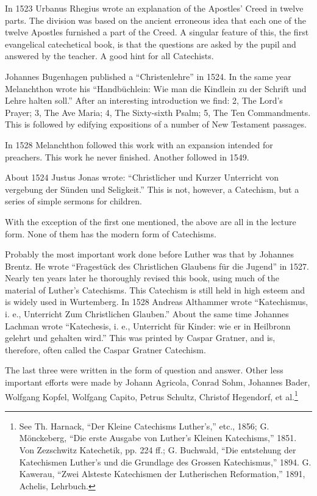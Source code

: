 In 1523 Urbanus Rhegius wrote an explanation of the Apostles’ Creed in twelve parts. The division was based on the ancient erroneous idea that each one of the twelve Apostles furnished a part of the Creed. A singular feature of this, the first evangelical
catechetical book, is that the questions are asked by the pupil and answered by the teacher. A good hint for all Catechists.

Johannes Bugenhagen published a “Christenlehre” in 1524. In the same year Melanchthon wrote his “Handbüchlein: Wie man die Kindlein zu der Schrift und Lehre halten soll.” After an interesting introduction we find: 2, The Lord’s Prayer; 3, The Ave Maria; 4, The Sixty-sixth Psalm; 5, The Ten Commandments. This is followed by edifying expositions of a number of New Testament passages.

In 1528 Melanchthon followed this work with an expansion intended for preachers. This work he never finished. Another followed in 1549.

About 1524 Justus Jonas wrote: “Christlicher und Kurzer Unterricht von vergebung der Sünden und Seligkeit.” This is not, however, a Catechism, but a series of simple sermons for children.

With the exception of the first one mentioned, the above are all in the lecture form. None of them has the modern form of Catechisms.

 Probably the most important work done before Luther was that by Johannes Brentz. He wrote “Fragestück des Christlichen Glaubens für die Jugend” in 1527. Nearly ten years later he thoroughly revised this book, using much of the material of Luther’s Catechisms. This Catechism is still held
in high esteem and is widely used in Wurtemberg. In 1528 Andreas Althammer wrote “Katechismus, i. e., Unterricht Zum Christlichen Glauben.” About the same time Johannes Lachman wrote “Katechesis, i. e., Unterricht für Kinder: wie er in Heilbronn gelehrt und gehalten wird.” This was printed by Caspar Gratner, and is, therefore, often called the Caspar Gratner Catechism.

The last three were written in the form of question and answer. Other less important efforts were made by Johann Agricola, Conrad Sohm, Johannes Bader, Wolfgang Kopfel, Wolfgang Capito, Petrus Schultz, Christof Hegendorf, et al.\footnote{See Th. Harnack, “Der Kleine Catechisms Luther’s,” etc., 1856; G. Mönckeberg, “Die erste Ausgabe von Luther’s Kleinen Katechisms,” 1851. Von Zezschwitz Katechetik, pp. 224 ff.; G. Buchwald, “Die entstehung der Katechismen Luther’s und die Grundlage des Grossen Katechismus,” 1894. G. Kawerau, “Zwei Alsteste Katechismen der Lutherischen Reformation,” 1891, Achelis, Lehrbuch.}

